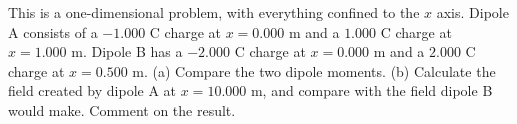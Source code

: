         This is a one-dimensional problem, with everything confined to
        the $x$ axis. Dipole A consists of a $-1.000$ C charge at $x=0.000$ m
        and a $1.000$ C charge at $x=1.000$ m. Dipole B has
        a $-2.000$ C charge at $x=0.000$ m
        and a $2.000$ C charge at $x=0.500$ m.\hwendpart
        (a) Compare the two dipole moments.\hwendpart
        (b) Calculate the field created by dipole A at $x=10.000$ m,
        and compare with the field dipole B would make. Comment on the
        result.\answercheck

